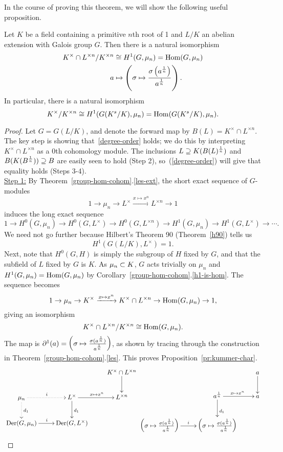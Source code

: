 In the course of proving this theorem, we will show the following useful proposition.
\begin{pr}
Let $K$ be a field containing a primitive $n$th root of 1 and $L/K$ an abelian extension with Galois group $G$. Then there is a natural isomorphism
\begin{align*}
K^{\times}\cap L^{\times n}/K^{\times n}&\cong H^1(G,\mu_n)=\operatorname{Hom}(G,\mu_n)\\
a&\mapsto \left( {\sigma \mapsto \frac{\sigma\left( {a^{\frac{1}{n}}} \right)}{a^{\frac{1}{n}}}} \right).
\end{align*}
In particular, there is a natural isomorphism
\[
K^{\times}/K^{\times n} \cong H^1(G(K^s/K),\mu_n)=\operatorname{Hom}(G(K^s/K),\mu_n).
\]
\end{pr}
\begin{proof}
Let $G=G(L/K)$, and denote the forward map by $B(L)=K^{\times}\cap L^{\times n}$. The key step is showing that~\eqref{degree-order} holds; we do this by interpreting $K^{\times}\cap L^{\times n}$ as a 0th cohomology module.  
The inclusions $L\supseteq K(B(L)^{\frac{1}{n}})$ and $B(K(B^{\frac{1}{n}}))\supseteq B$ are easily seen to hold (Step 2), so~(\ref{degree-order}) will give that equality holds (Steps 3-4).\\

\noindent\underline{Step 1:} By Theorem~\ref{group-hom-cohom}.\ref{les-ext}, the short exact sequence of $G$-modules 
\[
1\to \mu_n \to L^{\times}\xrightarrow{x\mapsto x^n} L^{\times n}\to 1 
\]
induces the long exact sequence
\[
1\to H^0(G,\mu_n) \to H^0(G,L^{\times})\to H^0(G,L^{\times n})\to H^1(G, \mu_n)\to H^1(G,L^{\times})\to \cdots.
\]
We need not go further because Hilbert's Theorem 90 (Theorem~\ref{h90}) tells us
\[
H^1(G(L/K), L^{\times})=1.
\]
Next, note that $H^0(G, H)$ is simply the subgroup of $H$ fixed by $G$, and that the subfield of $L$ fixed by $G$ is $K$.  %
As $\mu_n\subset K$, $G$ acts trivially on $\mu_n$ and $H^{1}(G,\mu_n)=\operatorname{Hom}(G,\mu_n)$ by Corollary~\ref{group-hom-cohom}.\ref{h1-is-hom}.  
The sequence becomes
\[
1\to \mu_n\to K^{\times}\xrightarrow{x\mapsto x^n} K^{\times}\cap L^{\times n} \to \operatorname{Hom}(G, \mu_n)\to 1,
\]
giving an isomorphism
\[
K^{\times}\cap L^{\times n}/K^{\times n}\cong \operatorname{Hom}(G, \mu_n).
\]
The map is $\partial^1(a)=\left( {\sigma\mapsto\frac{\sigma(a^{\frac{1}{n}})}{a^{\frac{1}{n}}}} \right)$, as shown by tracing through the construction in Theorem~\ref{group-hom-cohom}.\ref{les}. This proves Proposition~\ref{pr:kummer-char}.
\[
\xymatrix{
&& K^{\times}\cap L^{\times n}\ar[d]\\
\mu_n\ar@{.>}[r]^i \ar@{.>}[d]^{d_1}&  {L^{\times}}\ar[r]^{x\mapsto x^n} \ar[d]^{d_1}
& L^{\times n}\\
\Der(G, \mu_n)\ar[r]^i&\Der(G,L^{\times})\\
}
\xymatrix{
&& a\ar[d]\\
& a^{\rc n} \ar[r]^{x\mapsto x^n} \ar[d]^{d_1}
& a\\
\pa{\si\mapsto \frac{\si(a^{\rc n})}{a^{\rc n}}}\ar[r]^i&\pa{\si\mapsto \frac{\si(a^{\rc n})}{a^{\rc n}}}\\
}
\]


\end{proof}
